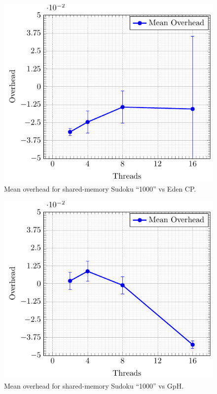 \documentclass[paper=A4,twoside=true,openright,parskip=full,chapterprefix=true,headings=normal,bibliography=totoc,listof=totoc,titlepage=on,captions=tableabove,draft=false,british]{scrreprt}%
\renewcommand{\enquote}[1]{{``}#1{''}}
\begin{document}
\begin{figure}
\centering
\includegraphics{src/img/overSMSudokuEden.pdf}
\caption{Mean overhead for shared-memory Sudoku \enquote{1000} vs Eden
CP.\label{fig:overSMSudokuEden}}
\end{figure}

\begin{figure}
\centering
\includegraphics{src/img/overSMSudokuGpH.pdf}
\caption{Mean overhead for shared-memory Sudoku \enquote{1000} vs
GpH.\label{fig:overSMSudokuGpH}}
\end{figure}
\end{document}
